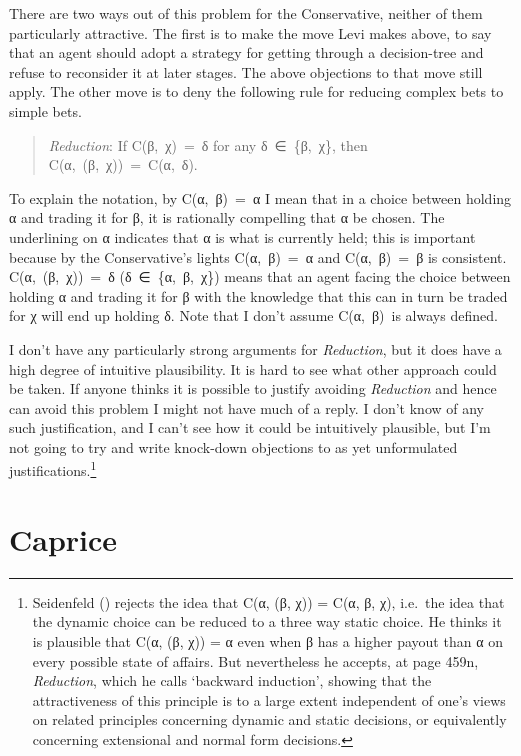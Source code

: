 \documentclass[
  11pt,
  letterpaper,
  DIV=11,
  numbers=noendperiod,
  twoside]{scrartcl}
\begin{document}
There are two ways out of this problem for the Conservative, neither of
them particularly attractive. The first is to make the move Levi makes
above, to say that an agent should adopt a strategy for getting through
a decision-tree and refuse to reconsider it at later stages. The above
objections to that move still apply. The other move is to deny the
following rule for reducing complex bets to simple bets.

\begin{quote}
\emph{Reduction}: If C(β,~χ)~=~δ for any δ~∈~\{β,~χ\}, then
C(α,~(β,~χ))~=~C(α,~δ).
\end{quote}

To explain the notation, by C(α,~β)~=~α I mean that in a choice between
holding α and trading it for β, it is rationally compelling that α be
chosen. The underlining on α indicates that α is what is currently held;
this is important because by the Conservative's lights C(α,~β)~=~α and
C(α,~β)~=~β is consistent. C(α,~(β,~χ))~=~δ (δ~∈~\{α,~β,~χ\}) means that
an agent facing the choice between holding α and trading it for β with
the knowledge that this can in turn be traded for χ will end up holding
δ. Note that I don't assume C(α,~β)~is always defined.

I don't have any particularly strong arguments for \emph{Reduction}, but
it does have a high degree of intuitive plausibility. It is hard to see
what other approach could be taken. If anyone thinks it is possible to
justify avoiding \emph{Reduction} and hence can avoid this problem I
might not have much of a reply. I don't know of any such justification,
and I can't see how it could be intuitively plausible, but I'm not going
to try and write knock-down objections to as yet unformulated
justifications.\footnote{Seidenfeld
  () rejects the idea that C(α, (β,
  χ)) = C(α, β, χ), i.e.~the idea that the dynamic choice can be reduced
  to a three way static choice. He thinks it is plausible that C(α, (β,
  χ)) = α even when β has a higher payout than α on every possible state
  of affairs. But nevertheless he accepts, at page 459n,
  \emph{Reduction}, which he calls `backward induction', showing that
  the attractiveness of this principle is to a large extent independent
  of one's views on related principles concerning dynamic and static
  decisions, or equivalently concerning extensional and normal form
  decisions.}

\section{Caprice}\label{caprice}
\end{document}

